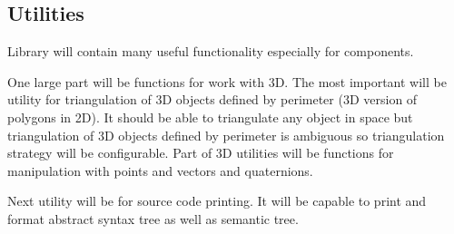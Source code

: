 \subsection{Utilities}

Library will contain many useful functionality especially for components.

One large part will be functions for work with 3D.
The most important will be utility for triangulation of 3D objects defined by perimeter (3D version of polygons in 2D).
It should be able to triangulate any object in space but triangulation of 3D objects defined by perimeter is ambiguous so triangulation strategy will be configurable.
Part of 3D utilities will be functions for manipulation with points and vectors and quaternions.

Next utility will be for source code printing.
It will be capable to print and format abstract syntax tree as well as semantic tree.

























